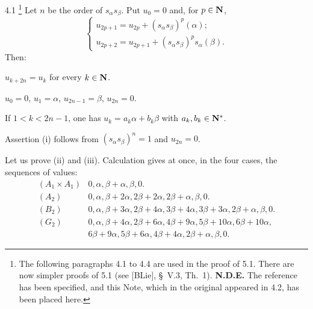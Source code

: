 \begin{proposition}{4.1}\label{XXI.4.1}
{\renewcommand{\thefootnote}{($*$)}\footnote{The following paragraphs 4.1 to 4.4 are used in the proof of 5.1. There are now simpler proofs of 5.1 (see [BLie], \S~V.3, Th.~1). \textbf{N.D.E.} The reference has been specified, and this Note, which in the original appeared in 4.2, has been placed here.}}%
Let $n$ be the order of $s_\alpha s_\beta$. Put $u_0=0$ and, for $p\in\mathbf{N}$,
\[
\begin{cases}
u_{2p+1}=u_{2p}+(s_\alpha s_\beta)^p(\alpha);\\
u_{2p+2}=u_{2p+1}+(s_\alpha s_\beta)^ps_\alpha(\beta).
\end{cases}
\]
Then:{\renewcommand{\thefootnote}{(17)}}
\begin{enumeratei}
\item $u_{k+2n}=u_k$ for every $k\in\mathbf{N}$.
\item $u_0=0$, $u_1=\alpha$, $u_{2n-1}=\beta$, $u_{2n}=0$.
\item If $1<k<2n-1$, one has $u_k=a_k\alpha+b_k\beta$ with $a_k,b_k\in\mathbf{N}^*$.
\end{enumeratei}
\end{proposition}
Assertion (i) follows from $(s_\alpha s_\beta)^n=1$ and $u_{2n}=0$.

Let us prove (ii) and (iii). Calculation gives at once, in the four cases, the sequences of values:{\renewcommand{\thefootnote}{(18)}}
\[
\begin{array}{ll}
(A_1\times A_1)&0,\alpha,\beta+\alpha,\beta,0.\\[3pt]
(A_2)&0,\alpha,\beta+2\alpha,2\beta+2\alpha,2\beta+\alpha,\beta,0.\\[3pt]
(B_2)&0,\alpha,\beta+3\alpha,2\beta+4\alpha,3\beta+4\alpha,3\beta+3\alpha,2\beta+\alpha,\beta,0.\\[3pt]
(G_2)&0,\alpha,\beta+4\alpha,2\beta+6\alpha,4\beta+9\alpha,5\beta+10\alpha,6\beta+10\alpha,\\
&6\beta+9\alpha,5\beta+6\alpha,4\beta+4\alpha,2\beta+\alpha,\beta,0.
\end{array}
\]

